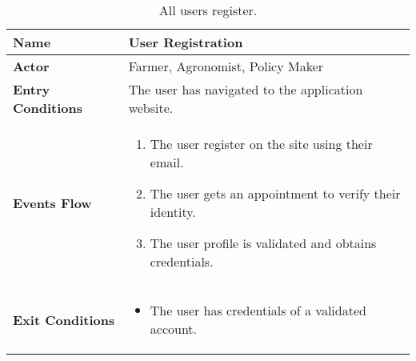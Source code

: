 
\begin{table}[hbt!]
\centering
\small
\caption{\label{tab:userUseReg}All users register.}

\renewcommand{\arraystretch}{1.25}
\begin{tabular}{|l|>{\raggedright\arraybackslash}m{12cm}|}
    \hline
    \textbf{Name} & User Registration\\
    \hline
   	\textbf{Actor} & Farmer, Agronomist, Policy Maker\\
    \hline
    \textbf{Entry Conditions} & The user has navigated to the application website.\\
    \hline
    
    \textbf{Events Flow} & \begin{enumerate}
    			\item The user register on the site using their email.
    			\item The user gets an appointment to verify their identity.
    			\item The user profile is validated and obtains credentials.
	    		\end{enumerate}
    	\\
    \hline
    \textbf{Exit Conditions} & \begin{itemize}
    	\item The user has credentials of a validated account.
   		\end{itemize} \\
    \hline
\end{tabular}
\end{table}